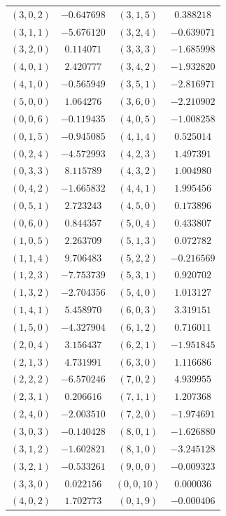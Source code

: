 \begin{table}
\begin{tabular}{cc@{\qquad}cc}
$(3,0,2)$ & $-0.647698$ & $(3,1,5)$ & $0.388218$ \\
$(3,1,1)$ & $-5.676120$ & $(3,2,4)$ & $-0.639071$ \\
$(3,2,0)$ & $0.114071$ & $(3,3,3)$ & $-1.685998$ \\
$(4,0,1)$ & $2.420777$ & $(3,4,2)$ & $-1.932820$ \\
$(4,1,0)$ & $-0.565949$ & $(3,5,1)$ & $-2.816971$ \\
$(5,0,0)$ & $1.064276$ & $(3,6,0)$ & $-2.210902$ \\
$(0,0,6)$ & $-0.119435$ & $(4,0,5)$ & $-1.008258$ \\
$(0,1,5)$ & $-0.945085$ & $(4,1,4)$ & $0.525014$ \\
$(0,2,4)$ & $-4.572993$ & $(4,2,3)$ & $1.497391$ \\
$(0,3,3)$ & $8.115789$ & $(4,3,2)$ & $1.004980$ \\
$(0,4,2)$ & $-1.665832$ & $(4,4,1)$ & $1.995456$ \\
$(0,5,1)$ & $2.723243$ & $(4,5,0)$ & $0.173896$ \\
$(0,6,0)$ & $0.844357$ & $(5,0,4)$ & $0.433807$ \\
$(1,0,5)$ & $2.263709$ & $(5,1,3)$ & $0.072782$ \\
$(1,1,4)$ & $9.706483$ & $(5,2,2)$ & $-0.216569$ \\
$(1,2,3)$ & $-7.753739$ & $(5,3,1)$ & $0.920702$ \\
$(1,3,2)$ & $-2.704356$ & $(5,4,0)$ & $1.013127$ \\
$(1,4,1)$ & $5.458970$ & $(6,0,3)$ & $3.319151$ \\
$(1,5,0)$ & $-4.327904$ & $(6,1,2)$ & $0.716011$ \\
$(2,0,4)$ & $3.156437$ & $(6,2,1)$ & $-1.951845$ \\
$(2,1,3)$ & $4.731991$ & $(6,3,0)$ & $1.116686$ \\
$(2,2,2)$ & $-6.570246$ & $(7,0,2)$ & $4.939955$ \\
$(2,3,1)$ & $0.206616$ & $(7,1,1)$ & $1.207368$ \\
$(2,4,0)$ & $-2.003510$ & $(7,2,0)$ & $-1.974691$ \\
$(3,0,3)$ & $-0.140428$ & $(8,0,1)$ & $-1.626880$ \\
$(3,1,2)$ & $-1.602821$ & $(8,1,0)$ & $-3.245128$ \\
$(3,2,1)$ & $-0.533261$ & $(9,0,0)$ & $-0.009323$ \\
$(3,3,0)$ & $0.022156$ & $(0,0,10)$ & $0.000036$ \\
$(4,0,2)$ & $1.702773$ & $(0,1,9)$ & $-0.000406$ \\

\end{tabular}
\end{table}
